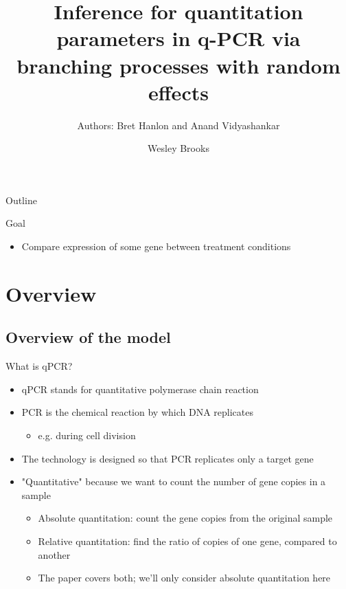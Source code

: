 \documentclass{beamer}
\author{Wesley Brooks}
\title[qPCR quantitation by branching processes]{Inference for quantitation parameters in q-PCR via branching processes with random effects}
\subtitle{Authors: Bret Hanlon and Anand Vidyashankar}
\institute{UW-Madison}
\begin{document}
\begin{frame}
\titlepage
\end{frame}


\begin{frame}{Outline}
  \tableofcontents
\end{frame}


\begin{frame}{Goal}
  \begin{itemize}
    \item Compare expression of some gene between treatment conditions
  \end{itemize}
\end{frame}

\section{Overview}
\subsection{Overview of the model}

\begin{frame}{What is qPCR?}
  \begin{itemize}
    \item qPCR stands for quantitative polymerase chain reaction
    \item PCR is the chemical reaction by which DNA replicates 
    \begin{itemize}
      \item e.g. during cell division
    \end{itemize}
    \item The technology is designed so that PCR replicates only a target gene
    \item "Quantitative" because we want to count the number of gene copies in a sample
    \begin{itemize}
      \item Absolute quantitation: count the gene copies from the original sample
      \item Relative quantitation: find the ratio of copies of one gene, compared to another
      \item The paper covers both; we'll only consider absolute quantitation here
    \end{itemize}
  \end{itemize}
\end{frame}
\end{document}
